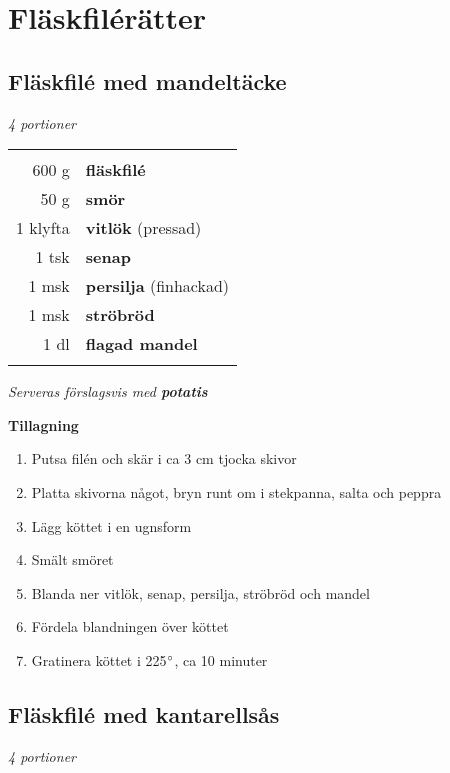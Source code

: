 \documentclass[a4paper,12pt]{article}
\newcommand{\port}[1]{\noindent \textit{#1 portioner}}
\newcommand{\tillb}[1]{\noindent \textit{Serveras förslagsvis med \textbf{#1}} \vspace{1cm}}
\begin{document}
\section{Fläskfilérätter}

\clearpage

\subsection{Fläskfilé med mandeltäcke}
\port{4}

\begin{table}[H]
	\begin{tabular}{rl}
	\hline
	&\\
		600 g & \textbf{fläskfilé}\\
		50 g & \textbf{smör}\\
		1 klyfta & \textbf{vitlök} (pressad)\\
		1 tsk & \textbf{senap}\\
		1 msk & \textbf{persilja} (finhackad)\\
		1 msk & \textbf{ströbröd}\\
		1 dl & \textbf{flagad mandel}\\
	&\\
	\hline
	\end{tabular}
\end{table}

\tillb{potatis}

\begin{multicols*}{2}

\noindent \textbf{Tillagning}
\begin{enumerate}
	\itemsep0cm
	\item Putsa filén och skär i ca 3 cm tjocka skivor
	\item Platta skivorna något, bryn runt om i stekpanna, salta och peppra
	\item Lägg köttet i en ugnsform
	\item Smält smöret
	\item Blanda ner vitlök, senap, \mbox{persilja}, ströbröd och mandel
	\item Fördela blandningen över \mbox{köttet}
	\item Gratinera köttet i 225$\degree$, ca 10 minuter
\end{enumerate}

\end{multicols*}

\clearpage

\subsection{Fläskfilé med kantarellsås}
\port{4}
\end{document}
